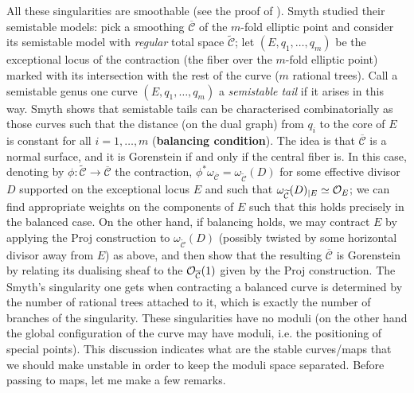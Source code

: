 All these singularities are smoothable (see the proof of \cite[Theorem 3.8]{SMY1}). Smyth studied their semistable models: pick a smoothing $\overline{\mathcal C}$ of the $m$-fold elliptic point and consider its semistable model with \emph{regular} total space $\widetilde{\mathcal C}$; let $(E,q_1,\ldots,q_m)$ be the exceptional locus of the contraction (the fiber over the $m$-fold elliptic point) marked with its intersection with the rest of the curve ($m$ rational trees). Call a semistable genus one curve $(E,q_1,\ldots,q_m)$ a \emph{semistable tail} if it arises in this way. Smyth shows \cite[Proposition 2.12]{SMY1} that semistable tails can be characterised combinatorially as those curves such that the distance (on the dual graph) from $q_i$ to the core of $E$ is constant for all $i=1,\ldots,m$ (\textbf{balancing condition}). The idea is that $\overline{\mathcal C}$ is a normal surface, and it is Gorenstein if and only if the central fiber is. In this case, denoting by $\phi\colon \widetilde{\mathcal C}\to\overline{\mathcal C}$ the contraction, $\phi^*\omega_{\overline{\mathcal C}}=\omega_{\widetilde{\mathcal C}}(D)$ for some effective divisor $D$ supported on the exceptional locus $E$ and such that $\omega_{\widetilde{\mathcal C}}(D)_{|E}\simeq\mathcal{O}_E$; we can find appropriate weights on the components of $E$ such that this holds precisely in the balanced case. On the other hand, if balancing holds, we may contract $E$ by applying the Proj construction to $\omega_{\widetilde{\mathcal C}}(D)$ (possibly twisted by some horizontal divisor away from $E$) as above, and then show that the resulting $\overline{\mathcal C}$ is Gorenstein by relating its dualising sheaf to the $\mathcal{O}_{\overline{\mathcal C}}(1)$ given by the Proj construction. The Smyth's singularity one gets when contracting a balanced curve is determined by the number of rational trees attached to it,  which is exactly the number of branches of the singularity. These singularities have no moduli (on the other hand the global configuration of the curve may have moduli, i.e. the positioning of special points). This discussion indicates what are the stable curves/maps that we should make unstable in order to keep the moduli space separated. Before passing to maps, let me make a few remarks.


